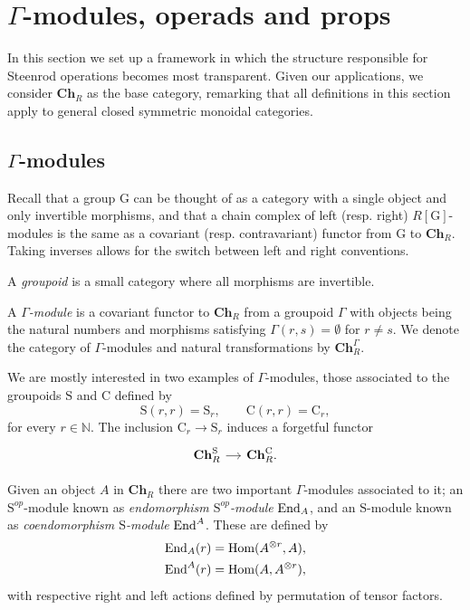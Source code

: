 
\section{\texorpdfstring{$\Gamma$}{Gamma}-modules, operads and props} \label{s:operads}

In this section we set up a framework in which the structure responsible for Steenrod operations becomes most transparent.
Given our applications, we consider $\mathbf{Ch}_R$ as the base category, remarking that all definitions in this section apply to general closed symmetric monoidal categories.

\subsection{$\Gamma$-modules}
Recall that a group $\mathrm G$ can be thought of as a category with a single object and only invertible morphisms, and that a chain complex of left (resp. right) $R[\mathrm G]$-modules is the same as a covariant (resp. contravariant) functor from $\mathrm G$ to $\mathbf{Ch}_R$.
Taking inverses allows for the switch between left and right conventions.

A \textit{groupoid} is a small category where all morphisms are invertible.
\begin{definition}
	A \textit{$\Gamma$-module} is a covariant functor to $\mathbf{Ch}_R$ from a groupoid $\Gamma$ with objects being the natural numbers and morphisms satisfying $\Gamma(r,s) = \emptyset$ for $r \neq s$.
	We denote the category of $\Gamma$-modules and natural transformations by $\mathbf{Ch}_R^\Gamma$.
\end{definition}

We are mostly interested in two examples of $\Gamma$-modules, those associated to the groupoids $\mathrm{S}$ and $\mathrm{C}$ defined by
\begin{equation*}
\mathrm{S}(r, r) = \mathrm{S}_r, \qquad
\mathrm{C}(r,r) = \mathrm{C}_r,
\end{equation*}
for every $r \in \mathbb{N}$.
The inclusion $\mathrm{C}_r \to \mathrm{S}_r$ induces a forgetful functor
\begin{equation*}
\begin{tikzcd} [column sep = small]
\mathbf{Ch}_R^\mathrm{S} \arrow[r] & \mathbf{Ch}_R^\mathrm{C}.
\end{tikzcd}
\end{equation*}

Given an object $A$ in $\mathbf{Ch}_R$ there are two important $\Gamma$-modules associated to it; an $\mathrm{S}^{op}$-module known as \textit{endomorphism $\mathrm{S}^{op}$-module} $\mathrm{End}_A$, and an $\mathrm{S}$-module known as \textit{coendomorphism $\mathrm{S}$-module} $\mathrm{End}^A$.
These are defined by
\begin{align*}
\mathrm{End}_A(r) &= \mathrm{Hom}(A^{\otimes r},A), \\
\mathrm{End}^A(r) &= \mathrm{Hom}(A,A^{\otimes r}),
\end{align*}
with respective right and left actions defined by permutation of tensor factors.


